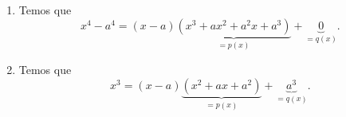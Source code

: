 \begin{enumerate}
	\item Temos que 
	\[
		x^4-a^4=(x-a)\underbrace{(x^3+ax^2+a^2x+a^3)}_{=p(x)}+\underbrace{0}_{=q(x)}.
	\]
	\item Temos que
	\[
		x^3=(x-a)\underbrace{(x^2+ax+a^2)}_{=p(x)}+\underbrace{a^3}_{=q(x)}.
	\]
\end{enumerate}
